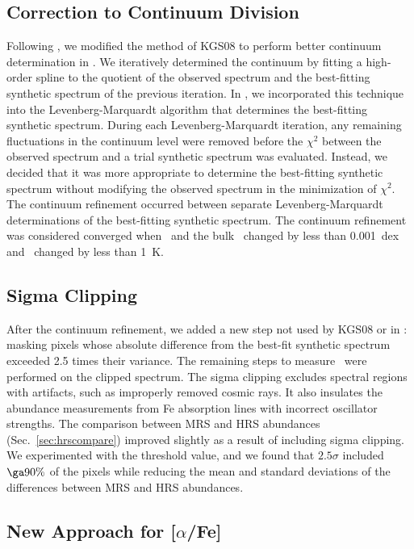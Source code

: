 \documentclass{emulateapj}
\begin{document}
\subsection{Correction to Continuum Division}
\label{sec:continuum}

Following \citet{she09}, we modified the method of KGS08 to perform
better continuum determination in \citeauthor*{kir09}.  We iteratively
determined the continuum by fitting a high-order spline to the
quotient of the observed spectrum and the best-fitting synthetic
spectrum of the previous iteration.  In \citeauthor*{kir09}, we
incorporated this technique into the Levenberg-Marquardt algorithm
that determines the best-fitting synthetic spectrum.  During each
Levenberg-Marquardt iteration, any remaining fluctuations in the
continuum level were removed before the $\chi^2$ between the observed
spectrum and a trial synthetic spectrum was evaluated.  Instead, we
decided that it was more appropriate to determine the best-fitting
synthetic spectrum without modifying the observed spectrum in the
minimization of $\chi^2$.  The continuum refinement occurred between
separate Levenberg-Marquardt determinations of the best-fitting
synthetic spectrum.  The continuum refinement was considered converged
when \feh\ and the bulk \afe\ changed by less than 0.001~dex and
\teff\ changed by less than 1~K.

\subsection{Sigma Clipping}
\label{sec:sigmaclip}

After the continuum refinement, we added a new step not used by KGS08
or in \citeauthor*{kir09}: masking pixels whose absolute difference
from the best-fit synthetic spectrum exceeded 2.5 times their
variance.  The remaining steps to measure \feh\ were performed on the
clipped spectrum.  The sigma clipping excludes spectral regions with
artifacts, such as improperly removed cosmic rays.  It also insulates
the abundance measurements from Fe absorption lines with incorrect
oscillator strengths.  The comparison between MRS and HRS abundances
(Sec.~\ref{sec:hrscompare}) improved slightly as a result of including
sigma clipping.  We experimented with the threshold value, and we
found that $2.5\sigma$ included $\ga 90\%$ of the pixels while
reducing the mean and standard deviations of the differences between
MRS and HRS abundances.

\subsection{New Approach for [$\alpha$/Fe]}
\label{sec:alphafe}
\end{document}
